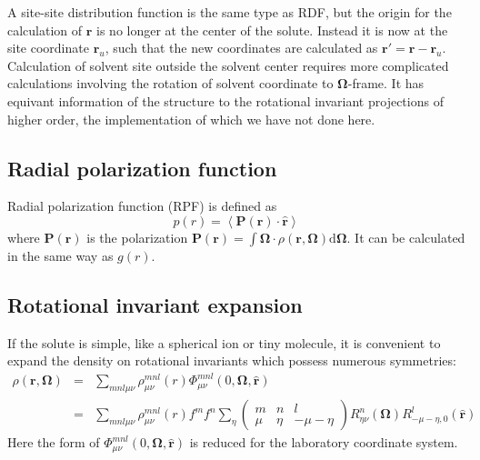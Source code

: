 A site-site distribution function is the same type as \acs{RDF},
but the origin for the calculation of $\mathbf{r}$ is no longer at
the center of the solute. Instead it is now at the site coordinate $\mathbf{r}_{u}$,
such that the new coordinates are calculated as $\mathbf{r}'=\mathbf{r}-\mathbf{r}_{u}$.
Calculation of solvent site outside the solvent center requires more
complicated calculations involving the rotation of solvent coordinate
to $\mathbf{\Omega}$-frame. It has equivant information of the structure
to the rotational invariant projections of higher order, the implementation
of which we have not done here.

\subsection{Radial polarization function}

Radial polarization function (\acs{RPF}) is defined as 
\begin{equation}
p(r)=\left\langle \mathbf{P}(\mathbf{r})\cdot\hat{\mathbf{r}}\right\rangle 
\end{equation}
where $\mathbf{P}(\mathbf{r})$ is the polarization $\mathbf{P}(\mathbf{r})=\int\mathbf{\Omega}\cdot\rho(\mathbf{r},\mathbf{\Omega})\mathrm{d}\mathbf{\Omega}$.
It can be calculated in the same way as $g(r)$.

\subsection{Rotational invariant expansion}

If the solute is simple, like a spherical ion or tiny molecule,
it is convenient to expand the density on rotational invariants which
possess numerous symmetries:
\begin{eqnarray}
\rho(\mathbf{r},\mathbf{\Omega}) & = & \sum_{mnl\mu\nu}\rho_{\mu\nu}^{mnl}(r)\Phi_{\mu\nu}^{mnl}(0,\mathbf{\Omega},\mathbf{\hat{r}})\label{eq:rot_invar_expansion}\\
 & = & \sum_{mnl\mu\nu}\rho_{\mu\nu}^{mnl}(r)f^{m}f^{n}\sum_{\eta}\left(\begin{array}{ccc}
m & n & l\\
\mu & \eta & -\mu-\eta
\end{array}\right)R_{\eta\nu}^{n}(\mathbf{\Omega})R_{-\mu-\eta,0}^{l}(\mathbf{\hat{r}})
\end{eqnarray}
Here the form of $\Phi_{\mu\nu}^{mnl}(0,\mathbf{\Omega},\mathbf{\hat{r}})$
is reduced for the laboratory coordinate system. 

